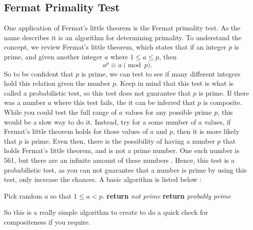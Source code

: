 \documentclass[11pt]{article}
\begin{document}
\subsection*{Fermat Primality Test}
One application of Fermat's little theorem is the Fermat primality test.
As the name describes it is an algorithm for determining primality.
To understand the concept, we review Fermat's little theorem, which
states that if an integer $p$ is prime, and given
another integer $a$ where $1 \le a \le p$, then \[a^p \equiv a \pmod{p}. \]
So to be confident that $p$ is prime, we can test to see if many different integers
hold this relation given the number $p$.
Keep in mind that this test is what is called a probabilistic test, so
this test does not guarantee that $p$ is prime.
If there was a number $a$ where this test fails, the it can be inferred that $p$ is
composite.
While you could test the full range of $a$ values for any possible prime $p$,
this would be a slow way to do it.
Instead, try for a some number of $a$ values, if Fermat's little theorem holds
for those values of $a$ and $p$, then it is more likely that $p$ is prime.
Even then, there is the possibility of having a number $p$ that holds 
Fermat's little theorem, and is not a prime number.
One such number is 561, but there are an infinite amount of these
numbers \cite{FermatTest}.
Hence, this test is a probabilistic test, as you can not guarantee that a number
is prime by using this test, only increase the chances.
A basic algorithm is listed below \cite{FermatTest}:

\begin{algorithm}
\begin{algorithmic}[0]
            \State Pick random $a$ so that $1 \le a < p$.
            \State \textbf{return} \emph{not prime}
            \EndIf
        \EndFor
        \State \textbf{return} \emph{probably prime}
    \EndProcedure
\end{algorithmic}
\end{algorithm}

So this is a really simple algorithm to create to do a quick check for 
compositeness if you require.
\end{document}
